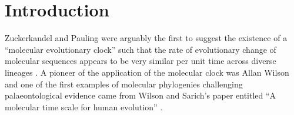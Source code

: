 \section{Introduction} 
Zuckerkandel and Pauling were arguably the first to suggest the existence of a ``molecular evolutionary clock'' such that the rate of evolutionary change of molecular sequences appears to be very similar per unit time across diverse lineages \cite{zuckerkandl1965}. A pioneer of the application of the molecular clock was Allan Wilson and one of the first examples of molecular phylogenies challenging palaeontological evidence came from Wilson and Sarich's paper entitled ``A molecular time scale for human evolution'' \cite{WilsonSarich1969}.
  
  
  
  
  
  
  
